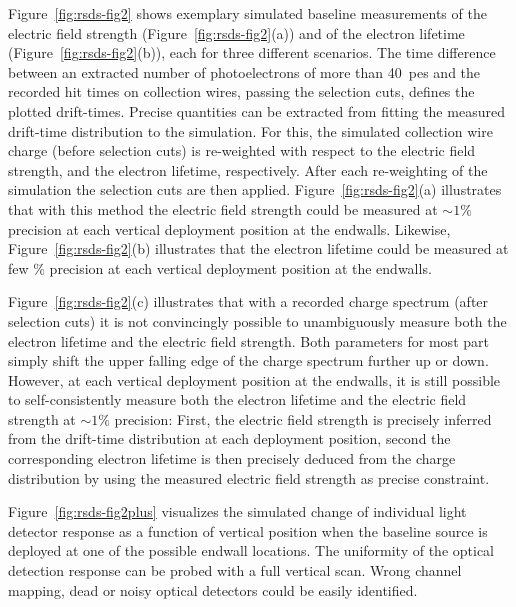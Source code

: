 Figure~\ref{fig:rsds-fig2}
shows exemplary simulated baseline  measurements of the electric field strength (Figure~\ref{fig:rsds-fig2}(a)) and of the electron lifetime (Figure~\ref{fig:rsds-fig2}(b)), each for three different scenarios. The time difference between an extracted number of photoelectrons of more than 40~pes and the recorded hit times on collection wires, passing the selection cuts, defines the plotted drift-times. Precise quantities can be extracted from fitting the measured drift-time distribution to the simulation. For this, the simulated collection wire charge (before selection cuts) is re-weighted with respect to 
the electric field strength, and 
the electron lifetime, respectively. After each re-weighting of the simulation the selection cuts are then applied. Figure~\ref{fig:rsds-fig2}(a)
illustrates that with this method the electric field strength could be measured at $\sim 1\%$ precision at each vertical deployment position at the endwalls. Likewise, Figure~\ref{fig:rsds-fig2}(b)
illustrates that the electron lifetime could be measured at few $\%$ precision at each vertical deployment position at the endwalls. 

Figure~\ref{fig:rsds-fig2}(c)
illustrates that with a recorded charge spectrum (after selection cuts) it is not convincingly possible to unambiguously measure both the electron lifetime and the electric field strength. Both parameters for most part simply shift the upper falling edge of the charge spectrum further up or down. However, at each vertical  deployment position at the endwalls, it is still possible to self-consistently measure both the electron lifetime and the electric field strength at $\sim 1\%$ precision: First, the electric field strength is precisely inferred from the drift-time distribution at each deployment position, second the corresponding electron lifetime is then precisely deduced from the charge distribution by using the measured electric field strength as precise constraint. 

Figure~\ref{fig:rsds-fig2plus} visualizes the simulated change of individual light detector response as a function of  vertical position when the baseline source is deployed at one of the possible endwall locations. The uniformity of the optical detection response can be probed with a full vertical scan. Wrong channel mapping, dead or noisy optical detectors could be easily identified. 

